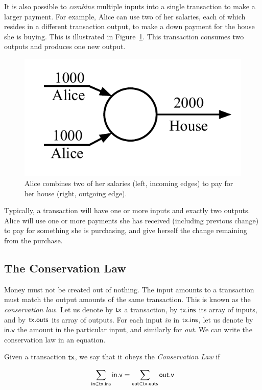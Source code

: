 It is also possible to \emph{combine} multiple inputs into a single transaction to make
a larger payment. For example, Alice can use two of her salaries, each of which resides
in a different transaction output, to make a down payment for the house she is buying.
This is illustrated in Figure~\ref{fig.utxo-multiple-inputs}. This transaction consumes
two outputs and produces one new output.

\begin{figure}[h]
    \centering
    \includegraphics[width=0.35 \columnwidth,keepaspectratio]{figures/utxo-multiple-inputs.pdf}
    \caption{Alice combines two of her salaries (left, incoming edges) to pay for her
             house (right, outgoing edge).}
    \label{fig.utxo-multiple-inputs}
\end{figure}

Typically, a transaction will have one or more inputs and exactly two outputs. Alice will use
one or more payments she has received (including previous change) to pay for something she is
purchasing, and give herself the change remaining from the purchase.

\subsection*{The Conservation Law}

Money must not be created out of nothing. The input amounts to a transaction must
match the output amounts of the same transaction. This is known as the \emph{conservation law}.
Let us denote by $\mathsf{tx}$ a transaction, by $\mathsf{tx}\textsf{.ins}$ its array of inputs,
and by $\mathsf{tx}\textsf{.outs}$ its array of outputs. For each input \emph{in} in
$\mathsf{tx}\textsf{.ins}$, let us denote by $\textsf{in.v}$ the amount in the particular
input, and similarly for \emph{out}. We can write the conservation law in an equation.

\begin{definition}
  Given a transaction $\mathsf{tx}$, we say that it obeys the \emph{Conservation Law} if

  \[
    \sum_{\textsf{in} \in \mathsf{tx}\textsf{.ins}} \textsf{in.v} = \sum_{\textsf{out} \in \mathsf{tx}\textsf{.outs}} \textsf{out.v}
  \]
\end{definition}

